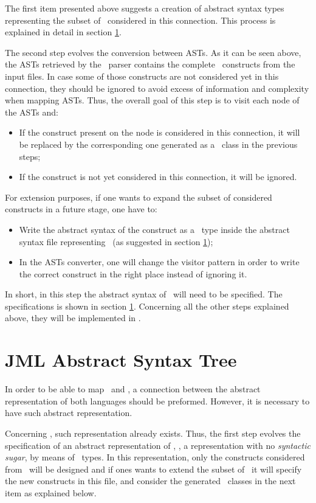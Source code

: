 The first item presented above suggests a creation of abstract syntax types representing the subset of \jml\ considered in this connection. This process is explained in detail in section \ref{chap4:sec:asts}. 

The second step evolves the conversion between ASTs. As it can be seen above, the ASTs retrieved by the \jml\ parser contains the complete \jml\ constructs from the input files. In case some of those constructs are not considered yet in this connection, they should be ignored to avoid excess of information and complexity when mapping ASTs. Thus, the overall goal of this step is to visit each node of the ASTs and:
\begin{itemize}
\item If the construct present on the node is considered in this connection, it will be replaced by the corresponding one generated as a \java\ class in the previous steps;
\item If the construct is not yet considered in this connection, it will be ignored.
\end{itemize} 
For extension purposes, if one wants to expand the subset of considered constructs in a future stage, one have to:
\begin{itemize}
\item Write the abstract syntax of the construct as a \vdm\ type inside the abstract syntax file representing \jml\ (as suggested in section \ref{chap4:sec:asts});
\item In the ASTs converter, one will change the visitor pattern in order to write the correct construct in the right place instead of ignoring it.
\end{itemize}
In short, in this step the abstract syntax of \jml\ will need to be specified. The specifications is shown in section \ref{chap4:sec:asts}. Concerning all the other steps explained above, they will be implemented in \java. 


\section{JML Abstract Syntax Tree}
\label{chap4:sec:asts}

In order to be able to map \jml\ and \vpp, a connection between the abstract representation of both languages should be preformed. However, it is necessary to have such abstract representation. 

Concerning \vpp, such representation already exists. Thus, the first step evolves the specification of an abstract representation of \jml, \ie, a representation with no \textit{syntactic sugar}, by means of \vdm\ types. In this representation, only the constructs considered from \jml\ will be designed and if ones wants to extend the subset of \jml\ it will specify the new constructs in this file, and consider the generated \java\ classes in the next item as explained below.

